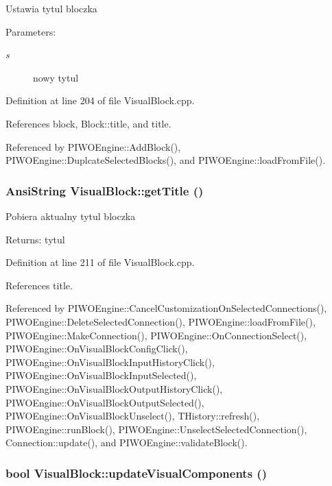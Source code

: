 Ustawia tytul bloczka \begin{Desc}
\item[Parameters:]
\begin{description}
\item[{\em s}]nowy tytul \end{description}
\end{Desc}


Definition at line 204 of file VisualBlock.cpp.

References block, Block::title, and title.

Referenced by PIWOEngine::AddBlock(), PIWOEngine::DuplcateSelectedBlocks(), and PIWOEngine::loadFromFile().\hypertarget{classVisualBlock_a7581d6b296ce3069bd7e16438fd330e}{
\subsubsection[getTitle]{\setlength{\rightskip}{0pt plus 5cm}AnsiString VisualBlock::getTitle ()}}
\label{classVisualBlock_a7581d6b296ce3069bd7e16438fd330e}


Pobiera aktualny tytul bloczka \begin{Desc}
\item[Returns:]tytul \end{Desc}


Definition at line 211 of file VisualBlock.cpp.

References title.

Referenced by PIWOEngine::CancelCustomizationOnSelectedConnections(), PIWOEngine::DeleteSelectedConnection(), PIWOEngine::loadFromFile(), PIWOEngine::MakeConnection(), PIWOEngine::OnConnectionSelect(), PIWOEngine::OnVisualBlockConfigClick(), PIWOEngine::OnVisualBlockInputHistoryClick(), PIWOEngine::OnVisualBlockInputSelected(), PIWOEngine::OnVisualBlockOutputHistoryClick(), PIWOEngine::OnVisualBlockOutputSelected(), PIWOEngine::OnVisualBlockUnselect(), THistory::refresh(), PIWOEngine::runBlock(), PIWOEngine::UnselectSelectedConnection(), Connection::update(), and PIWOEngine::validateBlock().\hypertarget{classVisualBlock_c484b8959917ac7901aad3ac60740b0d}{
\subsubsection[updateVisualComponents]{\setlength{\rightskip}{0pt plus 5cm}bool VisualBlock::updateVisualComponents ()}}
\label{classVisualBlock_c484b8959917ac7901aad3ac60740b0d}


